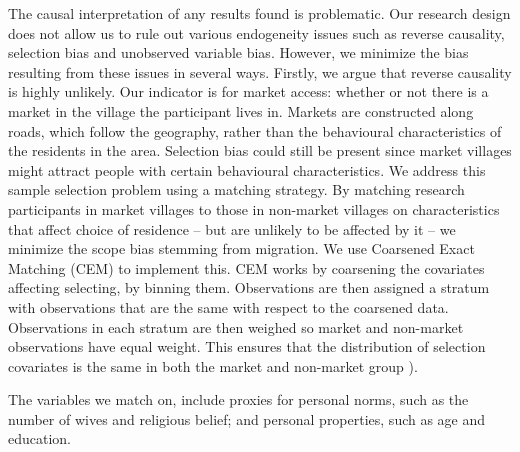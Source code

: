 
The causal interpretation of any results found is problematic. Our research design does not allow us to  rule out various endogeneity issues such as reverse causality, selection bias and unobserved variable bias. However, we minimize the bias resulting from these issues in several ways. Firstly, we argue that reverse causality is highly unlikely. Our indicator is for market access: whether or not there is a market in the village the participant lives in. Markets are constructed along roads, which follow the geography, rather than the behavioural characteristics of the residents in the area. Selection bias could still be present since market villages might attract people with certain behavioural characteristics. We address this sample selection problem using a matching strategy. By matching research participants in market villages to those in non-market villages on characteristics that affect choice of residence -- but are unlikely to be affected by it -- we minimize the scope bias stemming from migration. We use  Coarsened Exact Matching (CEM) to implement this. CEM works by coarsening the covariates affecting selecting, by binning them. Observations are then assigned a stratum with observations that are the same with respect to the coarsened data. Observations in each stratum are then weighed so market and non-market observations have equal weight. This ensures that the distribution of selection covariates is the same in both the market and non-market group \citep[(for a full review of the advantages of CEM over other matching procedures such as Propensity Score Matching, see ][]{Iacus2012}).

The variables we match on, include proxies for personal norms, such as the number of wives and religious belief; and personal properties, such as age and education. 




